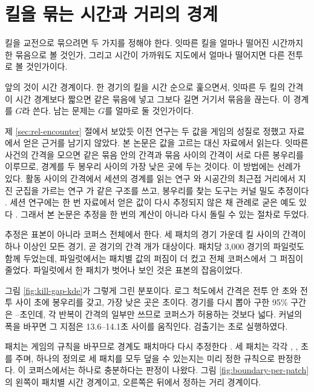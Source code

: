 \section{킬을 묶는 시간과 거리의 경계}
\label{sec:eng-temporal}
\label{sec:eng-spatial}

킬을 교전으로 묶으려면 두 가지를 정해야 한다. 잇따른 킬을 얼마나 떨어진 시간까지 한 묶음으로 볼 것인가, 그리고 시간이 가까워도 지도에서 얼마나 떨어지면 다른 전투로 볼 것인가이다.

앞의 것이 시간 경계이다. 한 경기의 킬을 시간 순으로 훑으면서, 잇따른 두 킬의 간격이 시간 경계보다 짧으면 같은 묶음에 넣고 그보다 길면 거기서 묶음을 끊는다. 이 경계를 $G$라 쓴다. 남는 문제는 $G$를 얼마로 둘 것인가이다.

제 \ref{sec:rel-encounter} 절에서 보았듯 이전 연구는 두 값을 게임의 성질로 정했고 자료에서 얻은 근거를 남기지 않았다. 본 논문은 값을 고르는 대신 자료에서 읽는다. 잇따른 사건의 간격을 모으면 같은 묶음 안의 간격과 묶음 사이의 간격이 서로 다른 봉우리를 이루므로, 경계를 두 봉우리 사이의 가장 낮은 곳에 두는 것이다. 이 방법에는 선례가 있다. 활동 사이의 간격에서 세션의 경계를 읽는 연구 \cite{halfaker2015session,mehrzadi2012session}와 시공간의 최근접 거리에서 지진 군집을 가르는 연구 \cite{zaliapin2013clusters}가 같은 구조를 쓰고, 봉우리를 찾는 도구는 커널 밀도 추정이다 \cite{silverman1981multimodality}. 세션 연구에는 한 번 자료에서 얻은 값이 다시 추정되지 않은 채 관례로 굳은 예도 있다 \cite{mehrzadi2012session}. 그래서 본 논문은 추정을 한 번의 계산이 아니라 다시 돌릴 수 있는 절차로 두었다.

추정은 표본이 아니라 코퍼스 전체에서 한다. 세 패치의 경기 가운데 킬 사이의 간격이 하나 이상인 모든 경기, 곧 \numMatchesDef{} 경기의 간격 \numIntervalsDef{}개가 대상이다. 패치당 3{,}000 경기의 파일럿도 함께 두었는데, 파일럿에서는 패치별 값의 퍼짐이 더 컸고 전체 코퍼스에서 그 퍼짐이 줄었다. 파일럿에서 한 패치가 벗어나 보인 것은 표본의 잡음이었다.

그림 \ref{fig:kill-gap-kde}가 그렇게 그린 분포이다. 로그 척도에서 간격은 전투 안 \constGmodeIn{}초와 전투 사이 \constGmodeOut{}초에 봉우리를 갖고, 가장 낮은 곳은 \constGest{}초이다. 경기를 다시 뽑아 구한 95\% 구간은 \constGciLo{}--\constGciHi{}초인데, 각 반복이 간격의 일부만 쓰므로 코퍼스가 허용하는 것보다 넓다. 커널의 폭을 바꾸면 그 지점은 13.6--14.1초 사이를 움직인다. 검출기는 \constG{}초로 실행하였다.



패치는 게임의 규칙을 바꾸므로 경계도 패치마다 다시 추정한다 \cite{chitayat2023beyond}. 세 패치는 각각 \constGpatchA{}, \constGpatchB{}, \constGpatchC{}초를 주며, 하나의 정의로 세 패치를 모두 덮을 수 있는지는 미리 정한 규칙으로 판정한다. 이 코퍼스에서는 하나로 충분하다는 판정이 나왔다. 그림 \ref{fig:boundary-per-patch}의 왼쪽이 패치별 시간 경계이고, 오른쪽은 뒤에서 정하는 거리 경계이다.

